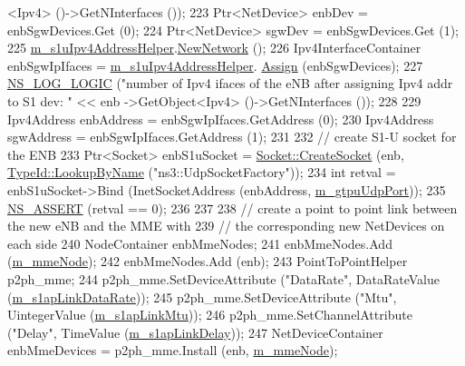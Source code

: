 \begin{DoxyCode}
      <Ipv4> ()->GetNInterfaces ());  
223   Ptr<NetDevice> enbDev = enbSgwDevices.Get (0);
224   Ptr<NetDevice> sgwDev = enbSgwDevices.Get (1);
225   \hyperlink{classns3_1_1PointToPointEpcHelper_a0566b197857168bbad76f8c72fd849d6}{m\_s1uIpv4AddressHelper}.\hyperlink{classns3_1_1Ipv4AddressHelper_a3277d133ef0d2669934a16a8206ba8e4}{NewNetwork} ();
226   Ipv4InterfaceContainer enbSgwIpIfaces = \hyperlink{classns3_1_1PointToPointEpcHelper_a0566b197857168bbad76f8c72fd849d6}{m\_s1uIpv4AddressHelper}.
      \hyperlink{classns3_1_1Ipv4AddressHelper_af8e7f4a1a7e74c00014a1eac445a27af}{Assign} (enbSgwDevices);
227   \hyperlink{group__logging_ga88acd260151caf2db9c0fc84997f45ce}{NS\_LOG\_LOGIC} (\textcolor{stringliteral}{"number of Ipv4 ifaces of the eNB after assigning Ipv4 addr to S1 dev: "} << enb
      ->GetObject<Ipv4> ()->GetNInterfaces ());
228   
229   Ipv4Address enbAddress = enbSgwIpIfaces.GetAddress (0);
230   Ipv4Address sgwAddress = enbSgwIpIfaces.GetAddress (1);
231 
232   \textcolor{comment}{// create S1-U socket for the ENB}
233   Ptr<Socket> enbS1uSocket = \hyperlink{classns3_1_1Socket_ad448a62bb50ad3dbac59c879a885a8d2}{Socket::CreateSocket} (enb, 
      \hyperlink{classns3_1_1TypeId_a119cf99c20931fdc294602cd360b180e}{TypeId::LookupByName} (\textcolor{stringliteral}{"ns3::UdpSocketFactory"}));
234   \textcolor{keywordtype}{int} retval = enbS1uSocket->Bind (InetSocketAddress (enbAddress, \hyperlink{classns3_1_1PointToPointEpcHelper_afe0543e08ac6d9ed1861e0685ca06ab1}{m\_gtpuUdpPort}));
235   \hyperlink{assert_8h_a6dccdb0de9b252f60088ce281c49d052}{NS\_ASSERT} (retval == 0);
236 
237 
238   \textcolor{comment}{// create a point to point link between the new eNB and the MME with}
239   \textcolor{comment}{// the corresponding new NetDevices on each side}
240   NodeContainer enbMmeNodes;
241   enbMmeNodes.Add (\hyperlink{classns3_1_1PointToPointEpcHelper_a426c5c35e890ce608c925348e4023b0f}{m\_mmeNode});
242   enbMmeNodes.Add (enb);
243   PointToPointHelper p2ph\_mme;
244   p2ph\_mme.SetDeviceAttribute (\textcolor{stringliteral}{"DataRate"}, DataRateValue (\hyperlink{classns3_1_1PointToPointEpcHelper_a732626ace34876e4846d9d86b191100c}{m\_s1apLinkDataRate}));
245   p2ph\_mme.SetDeviceAttribute (\textcolor{stringliteral}{"Mtu"}, UintegerValue (\hyperlink{classns3_1_1PointToPointEpcHelper_a1ca7acd9a9e782276d5580fd48bcda72}{m\_s1apLinkMtu}));
246   p2ph\_mme.SetChannelAttribute (\textcolor{stringliteral}{"Delay"}, TimeValue (\hyperlink{classns3_1_1PointToPointEpcHelper_aa396ad3f7fa4f88cea85ffc61481afb1}{m\_s1apLinkDelay}));  
247   NetDeviceContainer enbMmeDevices = p2ph\_mme.Install (enb, \hyperlink{classns3_1_1PointToPointEpcHelper_a426c5c35e890ce608c925348e4023b0f}{m\_mmeNode});

\end{DoxyCode}
